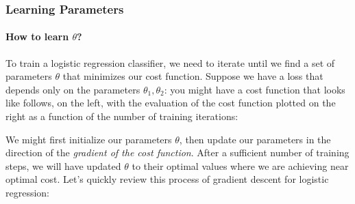 \documentclass[12pt]{article}
\begin{document}
\subsubsection{Learning Parameters}
\paragraph{How to learn $\theta$?} To train a logistic regression classifier, we need to iterate until we find a set of parameters $\theta$ that minimizes our cost function. Suppose we have a loss that depends only on the parameters $\theta_1, \theta_2$: you might have a cost function that looks like follows, on the left, with the evaluation of the cost function plotted on the right as a function of the number of training iterations:

\begin{minipage}{1.0\textwidth}
  \begin{multicols}{2}
\vfill\null \columnbreak
{}
\end{multicols}
\end{minipage}

We might first initialize our parameters $\theta$, then update our parameters in the direction of the \emph{gradient of the cost function}. After a sufficient number of training steps, we will have updated $\theta$ to their optimal values where we are achieving near optimal cost. Let's quickly review this process of gradient descent for logistic regression:
\end{document}
